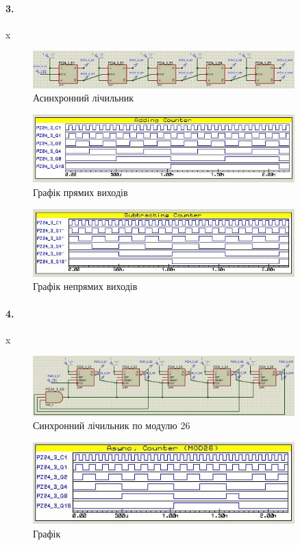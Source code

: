 \documentclass[12pt]{extarticle}
\begin{document}
\vspace{12pt}

\paragraph{3.}x

\begin{figure}[H]
    \centering
    \includegraphics[width=0.90\textwidth]{async_counter.jpg}
    \caption{Асинхронний лічильник}
\end{figure}
\begin{figure}[H]
    \centering
    \includegraphics[width=0.90\textwidth]{async_counter_graph_add.jpg}
    \caption{Графік прямих виходів}
\end{figure}
\begin{figure}[H]
    \centering
    \includegraphics[width=0.90\textwidth]{async_counter_graph_sub.jpg}
    \caption{Графік непрямих виходів}
\end{figure}
\paragraph{4.}x
\begin{figure}[H]
    \centering
    \includegraphics[width=0.90\textwidth]{async_mod_counter.jpg}
    \caption{Синхронний лічильник по модулю 26}
\end{figure}
\begin{figure}[H]
    \centering
    \includegraphics[width=0.90\textwidth]{async_mod_counter_graph.jpg}
    \caption{Графік}
\end{figure}
\end{document}
